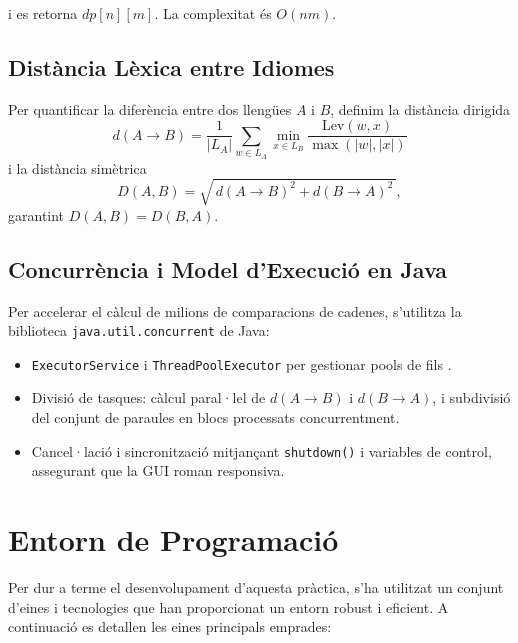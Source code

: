 \documentclass{ieeetj}
\begin{document}
i es retorna \(dp[n][m]\). La complexitat és \(O(nm)\).

\subsection{Distància Lèxica entre Idiomes}
Per quantificar la diferència entre dos llengües \(A\) i \(B\), definim la distància dirigida
\[
d(A\!\to\!B)
=
\frac{1}{|L_A|}
\sum_{w\in L_A}
\min_{x\in L_B}
\frac{\mathrm{Lev}(w,x)}{\max(|w|,|x|)}
\]
i la distància simètrica
\[
D(A,B)
=
\sqrt{\,d(A\!\to\!B)^2 + d(B\!\to\!A)^2\,},
\]
garantint \(D(A,B)=D(B,A)\).

\subsection{Concurrència i Model d’Execució en Java}
Per accelerar el càlcul de milions de comparacions de cadenes, s’utilitza la biblioteca \texttt{java.util.concurrent} de Java:  
\begin{itemize}
  \item \texttt{ExecutorService} i \texttt{ThreadPoolExecutor} per gestionar pools de fils \cite{oracleExecutorService}.  
  \item Divisió de tasques: càlcul paral·lel de \(d(A\!\to\!B)\) i \(d(B\!\to\!A)\), i subdivisió del conjunt de paraules en blocs processats concurrentment.  
  \item Cancel·lació i sincronització mitjançant \texttt{shutdown()} i variables de control, assegurant que la GUI roman responsiva.
\end{itemize}

\section{Entorn de Programació}

Per dur a terme el desenvolupament d’aquesta pràctica, s’ha utilitzat un conjunt d’eines i tecnologies que han proporcionat un entorn robust i eficient. A continuació es detallen les eines principals emprades:
\end{document}
